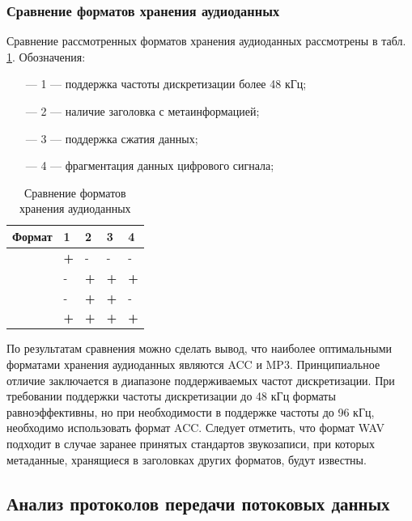 	\subsubsection{Сравнение форматов хранения аудиоданных}
		\par Сравнение рассмотренных форматов хранения аудиоданных рассмотрены в табл. \ref{tab:comparsion}. 
		Обозначения:
		\begin{itemize}
			\item[---] 1 --- поддержка частоты дискретизации более 48 кГц;
			\item[---] 2 --- наличие заголовка с метаинформацией;
			\item[---] 3 --- поддержка сжатия данных;
			\item[---] 4 --- фрагментация данных цифрового сигнала;
		\end{itemize}
		\begin{table}[hbtp]
			\caption{Сравнение форматов хранения аудиоданных}
			\centering
			\label{tab:comparsion}
			\begin{tabular}{|l|l|l|l|l|}
				\hline
				\textbf{Формат} & \textbf{1} & \textbf{2} & \textbf{3} & \textbf{4}   \\ \hline
				\text{WAV} & \textbf{+} & -          & -          &   -        \\ \hline
				\text{MP3} &   -        & \textbf{+} & \textbf{+} & \textbf{+} \\ \hline
				\text{MP4} &   -        & \textbf{+} & \textbf{+} & -          \\ \hline
				\text{ACC} & \textbf{+} & \textbf{+} & \textbf{+} & \textbf{+} \\ \hline
			\end{tabular}%
		\end{table}

		\par По результатам сравнения можно сделать вывод, что наиболее оптимальными форматами хранения аудиоданных являются ACC и MP3.
		Принципиальное отличие заключается в диапазоне поддерживаемых частот дискретизации. 
		При требовании поддержки частоты дискретизации до 48 кГц форматы равноэффективны, но при необходимости в поддержке частоты до 96 кГц,
		необходимо использовать формат ACC.
		Следует отметить, что формат WAV подходит в случае заранее принятых стандартов звукозаписи,
		при которых метаданные, хранящиеся в заголовках других форматов, будут известны. 

\subsection{Анализ протоколов передачи потоковых данных}


